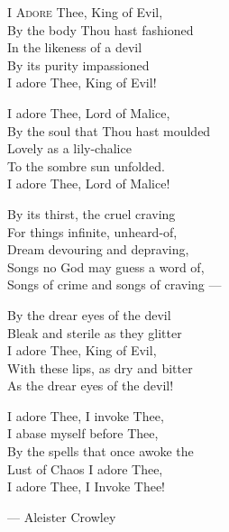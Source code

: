 \vspace*{\fill}

\begin{Verse}
I \textsc{Adore} Thee, King of Evil,\\
By the body Thou hast fashioned\\
In the likeness of a devil\\
By its purity impassioned\\
I adore Thee, King of Evil!

I adore Thee, Lord of Malice,\\
By the soul that Thou hast moulded\\
Lovely as a lily-chalice\\
To the sombre sun unfolded.\\
I adore Thee, Lord of Malice!

By its thirst, the cruel craving\\
For things infinite, unheard-of,\\
Dream devouring and depraving,\\
Songs no God may guess a word of,\\
Songs of crime and songs of craving ---

By the drear eyes of the devil\\
Bleak and sterile as they glitter\\
I adore Thee, King of Evil,\\
With these lips, as dry and bitter\\
As the drear eyes of the devil!

I adore Thee, I invoke Thee,\\
I abase myself before Thee,\\
By the spells that once awoke the \\
Lust of Chaos I adore Thee, \\
I adore Thee, I Invoke Thee! 

\centering
--- Aleister Crowley
\par
\end{Verse}
\vspace*{\fill}
